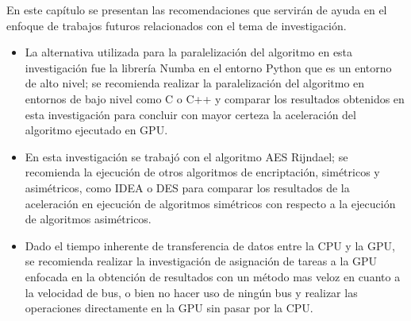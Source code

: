 \documentclass[../main/main.tex]{subfiles}
\begin{document}
\espacio
  En este capítulo se presentan las recomendaciones que servirán de ayuda en el enfoque de trabajos futuros relacionados con el tema de investigación.

  \begin{itemize}[noitemsep,nolistsep]
    \item La alternativa utilizada para la paralelización del algoritmo en esta investigación fue la librería Numba en el entorno Python que es un entorno de alto nivel; se recomienda realizar la paralelización del algoritmo en entornos de bajo nivel como C o C++ y comparar los resultados obtenidos en esta investigación para concluir con mayor certeza la aceleración del algoritmo ejecutado en GPU.
    \item En esta investigación se trabajó con el algoritmo AES Rijndael; se recomienda la ejecución de otros algoritmos de encriptación, simétricos y asimétricos, como IDEA o DES para comparar los resultados de la aceleración en ejecución de algoritmos simétricos con respecto a la ejecución de algoritmos asimétricos.
    \item Dado el tiempo inherente de transferencia de datos entre la CPU y la GPU, se recomienda realizar la investigación de asignación de tareas a la GPU enfocada en la obtención de resultados con un método mas veloz en cuanto a la velocidad de bus, o bien no hacer uso de ningún bus y realizar las operaciones directamente en la GPU sin pasar por la CPU.
  \end{itemize}
\end{document}
